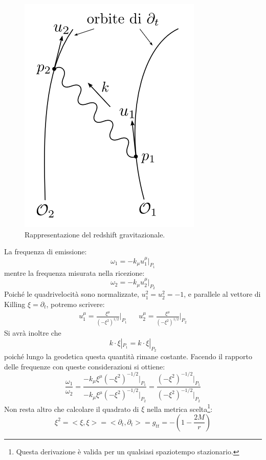 \begin{figure}
    \centering
    \includegraphics[scale=0.5]{immagini/redshiftgravi.png}
    \caption{Rappresentazione del redshift gravitazionale.}
    \label{fig.redshiftgravit}
\end{figure}
La frequenza di emissione:
\begin{equation*}
    \omega_1 = -k_\mu u^\mu_1 |_{P_1}
\end{equation*}
mentre la frequenza misurata nella ricezione:
\begin{equation*}
    \omega_2 = -k_\mu u^\mu_2 |_{P_2}
\end{equation*}
Poiché le quadrivelocità sono normalizzate, $u_1 ^2 = u_2 ^2 = -1$, e parallele al vettore di Killing $\xi =\partial_t$, potremo scrivere:
\begin{align*}
    u_1^\mu = \frac{\xi^\mu}{(-\xi^2)^{1/2}}\big|_{P_1} &&  u_2^\mu = \frac{\xi^\mu}{(-\xi^2)^{1/2}}\big|_{P_2}
\end{align*}
Si avrà inoltre che
\begin{equation*}
    k \cdot \xi |_{P_1} = k \cdot \xi |_{P_2}
\end{equation*}
poiché lungo la geodetica questa quantità rimane costante. Facendo il rapporto delle frequenze con queste considerazioni si ottiene:
\begin{equation*}
    \frac{\omega_1}{\omega_2} = \frac{ - k_\mu \xi^\mu (-\xi^2)^{-1/2}|_{P_1}}{ - k_\mu \xi^\mu (-\xi^2)^{-1/2}|_{P_2}} = \frac{(-\xi^2)^{-1/2}|_{P_1}}{(-\xi^2)^{-1/2}|_{P_2}}
\end{equation*}
Non resta altro che calcolare il quadrato di $\xi$ nella metrica scelta\footnote{Questa derivazione è valida per un qualsiasi spaziotempo stazionario.}:
\begin{equation*}
    \xi^2 = < \xi, \xi > = < \partial_t, \partial_t > = g_{tt} = - \left( 1-\frac{2M}{r}\right)
\end{equation*}

